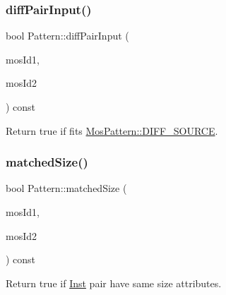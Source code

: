 \mbox{\label{classPattern_a8e30aad375e98bbcdeab764705e68045}} 
\subsubsection{\texorpdfstring{diff\+Pair\+Input()}{diffPairInput()}}
{\footnotesize\ttfamily bool Pattern\+::diff\+Pair\+Input (\begin{DoxyParamCaption}\item[{\hyperlink{type_8h_a581e8093e28e7362f2b6937296190676}{Index\+Type}}]{mos\+Id1,  }\item[{\hyperlink{type_8h_a581e8093e28e7362f2b6937296190676}{Index\+Type}}]{mos\+Id2 }\end{DoxyParamCaption}) const\hspace{0.3cm}{\ttfamily [private]}}



Return true if fits \hyperlink{type_8h_af19eddb079bfea723256710b029c38e8ad45b64a7d6b85dde1b52dd5a18863933}{Mos\+Pattern\+::\+D\+I\+F\+F\+\_\+\+S\+O\+U\+R\+CE}. 

\mbox{\label{classPattern_ae25db8902e007a9ab055e64f3347d65d}} 
\subsubsection{\texorpdfstring{matched\+Size()}{matchedSize()}}
{\footnotesize\ttfamily bool Pattern\+::matched\+Size (\begin{DoxyParamCaption}\item[{\hyperlink{type_8h_a581e8093e28e7362f2b6937296190676}{Index\+Type}}]{mos\+Id1,  }\item[{\hyperlink{type_8h_a581e8093e28e7362f2b6937296190676}{Index\+Type}}]{mos\+Id2 }\end{DoxyParamCaption}) const\hspace{0.3cm}{\ttfamily [private]}}



Return true if \hyperlink{classInst}{Inst} pair have same size attributes. 

\mbox{\label{classPattern_ab7112a78b0ed0c7638f1af9efdf80955}} 
